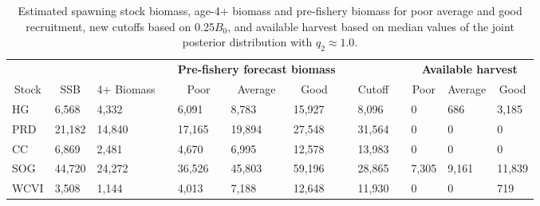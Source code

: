 %
\begin{table}[!tbp]
 \small
 \caption{Estimated spawning stock biomass,  age-4+ biomass and pre-fishery
			biomass for poor average and good recruitment,  new cutoffs based on 0.25$B_0$,  and 
			available harvest based on median values of the joint posterior distribution with $q_2 \approx 1.0$.\label{TableCatchAdvice2}} 
 \begin{center}
 \begin{tabular}{lllclllclclll}\hline\hline
\multicolumn{3}{c}{\bfseries }&
\multicolumn{1}{c}{\bfseries }&
\multicolumn{3}{c}{\bfseries Pre-fishery forecast biomass}&
\multicolumn{1}{c}{\bfseries }&
\multicolumn{1}{c}{\bfseries }&
\multicolumn{1}{c}{\bfseries }&
\multicolumn{3}{c}{\bfseries Available harvest}
\tabularnewline \cline{1-13}
\multicolumn{1}{c}{Stock}&\multicolumn{1}{c}{SSB}&\multicolumn{1}{c}{4+ Biomass}&\multicolumn{1}{c}{}&\multicolumn{1}{c}{Poor}&\multicolumn{1}{c}{Average}&\multicolumn{1}{c}{Good}&\multicolumn{1}{c}{}&\multicolumn{1}{c}{Cutoff}&\multicolumn{1}{c}{}&\multicolumn{1}{c}{Poor}&\multicolumn{1}{c}{Average}&\multicolumn{1}{c}{Good}\tabularnewline
\hline
HG& 6,568& 4,332&& 6,091& 8,783&15,927&& 8,096&&     0&   686& 3,185\tabularnewline
PRD&21,182&14,840&&17,165&19,894&27,548&&31,564&&     0&     0&     0\tabularnewline
CC& 6,869& 2,481&& 4,670& 6,995&12,578&&13,983&&     0&     0&     0\tabularnewline
SOG&44,720&24,272&&36,526&45,803&59,196&&28,865&& 7,305& 9,161&11,839\tabularnewline
WCVI& 3,508& 1,144&& 4,013& 7,188&12,648&&11,930&&     0&     0&   719\tabularnewline
\hline
\end{tabular}

\end{center}

\end{table}

